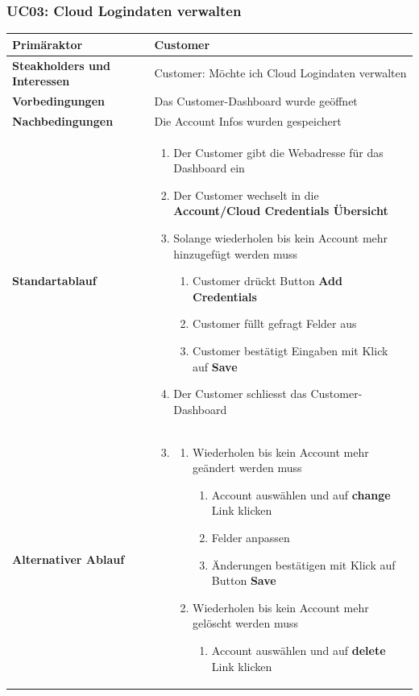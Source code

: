 \documentclass[11pt]{scrartcl}
\begin{document}
\subsubsection{UC03: Cloud Logindaten verwalten}
\begin{longtabu} to \textwidth {X[1,l] X[2,l]}
	\bfseries Primäraktor & Customer  \\\hline 
	\bfseries Steakholders und Interessen & Customer: Möchte ich Cloud Logindaten verwalten  \\\hline 
	\bfseries Vorbedingungen & Das Customer-Dashboard wurde geöffnet  \\\hline 
	\bfseries Nachbedingungen & Die Account Infos wurden gespeichert  \\\hline 
	\bfseries Standartablauf & 
		\begin{enumerate}
			\item Der Customer gibt die Webadresse für das Dashboard ein
			\item Der Customer wechselt in die \textbf{Account/Cloud Credentials Übersicht}
			\item Solange wiederholen bis kein Account mehr hinzugefügt werden muss
			  \begin{enumerate}
			    \item Customer drückt Button \textbf{Add Credentials}
			    \item Customer füllt gefragt Felder aus
			    \item Customer bestätigt Eingaben mit Klick auf \textbf{Save}
			  \end{enumerate}
			\item Der Customer schliesst das Customer-Dashboard
		\end{enumerate}
      \\\hline
      \bfseries Alternativer Ablauf & 
      \begin{enumerate}
          \setcounter{enumi}{2}
            \item 
            \begin{enumerate}
              \item Wiederholen bis kein Account mehr geändert werden muss
                \begin{enumerate}
                  \item Account auswählen und auf \textbf{change} Link klicken
                  \item Felder anpassen
                  \item Änderungen bestätigen mit Klick auf Button \textbf{Save}
                \end{enumerate}
                \item Wiederholen bis kein Account mehr gelöscht werden muss
                \begin{enumerate}
                  \item Account auswählen und auf \textbf{delete} Link klicken
                \end{enumerate}
            \end{enumerate}
            

\end{enumerate}
\end{longtabu}
\end{document}
